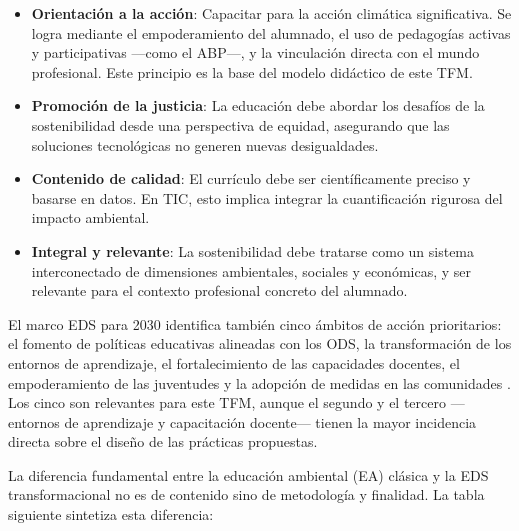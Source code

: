 \begin{itemize}
\item \textbf{Orientación a la acción}: Capacitar para la acción climática significativa. Se logra mediante el empoderamiento del alumnado, el uso de pedagogías activas y participativas —como el ABP—, y la vinculación directa con el mundo profesional. Este principio es la base del modelo didáctico de este TFM.
\item \textbf{Promoción de la justicia}: La educación debe abordar los desafíos de la sostenibilidad desde una perspectiva de equidad, asegurando que las soluciones tecnológicas no generen nuevas desigualdades.
\item \textbf{Contenido de calidad}: El currículo debe ser científicamente preciso y basarse en datos. En TIC, esto implica integrar la cuantificación rigurosa del impacto ambiental.
\item \textbf{Integral y relevante}: La sostenibilidad debe tratarse como un sistema interconectado de dimensiones ambientales, sociales y económicas, y ser relevante para el contexto profesional concreto del alumnado.
\end{itemize}


El marco EDS para 2030 identifica también cinco ámbitos de acción prioritarios: el fomento de políticas educativas alineadas con los ODS, la transformación de los entornos de aprendizaje, el fortalecimiento de las capacidades docentes, el empoderamiento de las juventudes y la adopción de medidas en las comunidades \cite{unesco2020educacion}. Los cinco son relevantes para este TFM, aunque el segundo y el tercero —entornos de aprendizaje y capacitación docente— tienen la mayor incidencia directa sobre el diseño de las prácticas propuestas.


La diferencia fundamental entre la educación ambiental (EA) clásica y la EDS transformacional no es de contenido sino de metodología y finalidad. La tabla siguiente sintetiza esta diferencia:


